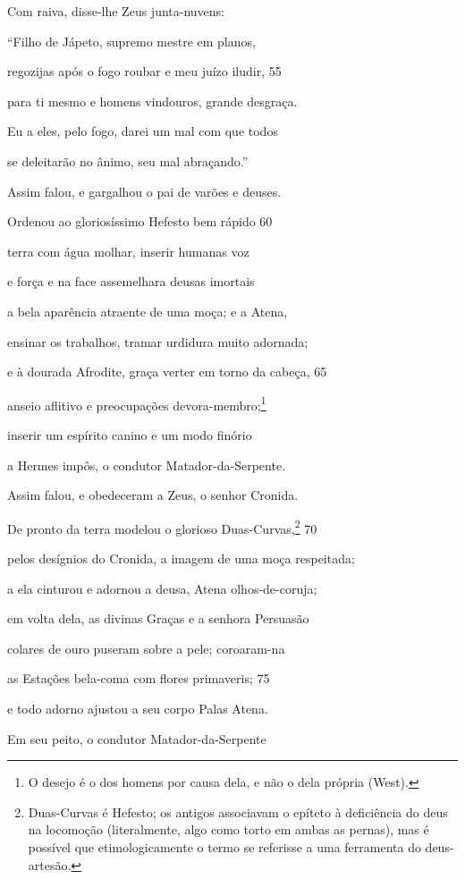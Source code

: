 Com raiva, disse-lhe Zeus junta-nuvens:

``Filho de Jápeto, supremo mestre em planos,

regozijas após o fogo roubar e meu juízo iludir, \num{55}

para ti mesmo e homens vindouros, grande desgraça.

Eu a eles, pelo fogo, darei um mal com que todos

se deleitarão no ânimo, seu mal abraçando.''

Assim falou, e gargalhou o pai de varões e deuses.

Ordenou ao gloriosíssimo Hefesto bem rápido \num{60}

terra com água molhar, inserir humanas voz

e força e na face assemelhara deusas imortais

a bela aparência atraente de uma moça; e a Atena,

ensinar os trabalhos, tramar urdidura muito adornada;

e à dourada Afrodite, graça verter em torno da cabeça, \num{65}

anseio aflitivo e preocupações devora-membro;\footnote{O desejo é o dos homens por causa dela, e não o dela própria (West).}

inserir um espírito canino e um modo finório

a Hermes impôs, o condutor Matador-da-Serpente.

Assim falou, e obedeceram a Zeus, o senhor Cronida.

De pronto da terra modelou o glorioso Duas-Curvas,\footnote{Duas-Curvas é Hefesto; os antigos associavam o epíteto à deficiência
do deus na locomoção (literalmente, algo como torto em ambas as pernas),
mas é possível que etimologicamente o termo se referisse a uma
ferramenta do deus-artesão.} \num{70}

pelos desígnios do Cronida, a imagem de uma moça respeitada;

a ela cinturou e adornou a deusa, Atena olhos-de-coruja;

em volta dela, as divinas Graças e a senhora Persuasão

colares de ouro puseram sobre a pele; coroaram-na

as Estações bela-coma com flores primaveris; \num{75}

e todo adorno ajustou a seu corpo Palas Atena.

Em seu peito, o condutor Matador-da-Serpente

